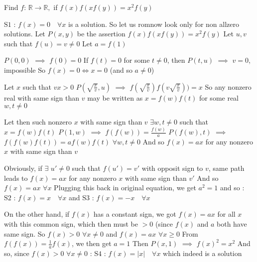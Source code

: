 \begin{solution}
	\begin{tcolorbox}Find $f$: $\mathbb{R} \to \mathbb{R},$ if $f(x) f(xf(y)) = x^2 f(y)$\end{tcolorbox}
$\boxed{\text{S1 : }f(x)=0\quad\forall x}$ is a solution. So let us romnow look only for non allzero solutions.
Let $P(x,y)$ be the assertion $f(x)f(xf(y))=x^2f(y)$
Let $u,v$ such that $f(u)=v\ne 0$
Let $a=f(1)$

$P(0,0)$ $\implies$ $f(0)=0$
If $f(t)=0$ for some $t\ne 0$, then $P(t,u)$ $\implies$ $v=0$, impossible
So $f(x)=0\iff x=0$ (and so $a\ne 0$)

Let $x$ such that $vx>0$
$P(\sqrt{\frac xv},u)$ $\implies$ $f(\sqrt{\frac xv})f(v\sqrt{\frac xv}))=x$
So any nonzero real with same sign than $v$ may be written as $x=f(w)f(t)$ for some real $w,t\ne 0$

Let then such nonzero $x$ with same sign than $v$
$\exists w,t\ne 0$ such that $x=f(w)f(t)$
$P(1,w)$ $\implies$ $f(f(w))=\frac{f(w)}a$
$P(f(w),t)$ $\implies$ $f(f(w)f(t))=af(w)f(t)$ $\forall w,t\ne 0$
And so $f(x)=ax$ for any nonzero $x$ with same sign than $v$

Obviously, if $\exists$ $u'\ne 0$ such that $f(u')=v'$ with opposit sign to $v$, same path leads to
$f(x)=ax$ for any nonzero $x$ with same sign than $v'$
And so $f(x)=ax$ $\forall x$
Plugging this back in original equation, we get $a^2=1$ and so :
$\boxed{\text{S2 : }f(x)=x\quad\forall x}$ and $\boxed{\text{S3 : }f(x)=-x\quad\forall x}$

On the other hand, if $f(x)$ has a constant sign, we got
$f(x)=ax$ for all $x$ with this common sign, which then must be $>0$ (since $f(x)$ and $a$ both have same sign.
So $f(x)>0$ $\forall x\ne 0$ and $f(x)=ax$ $\forall x\ge 0$
From $f(f(x))=\frac 1af(x)$, we then get $a=1$
Then $P(x,1)$ $\implies$ $f(x)^2=x^2$
And so, since $f(x)>0$ $\forall x\ne 0$ :
$\boxed{\text{S4 : }f(x)=|x|\quad\forall x}$ which indeed is a solution



\end{solution}



